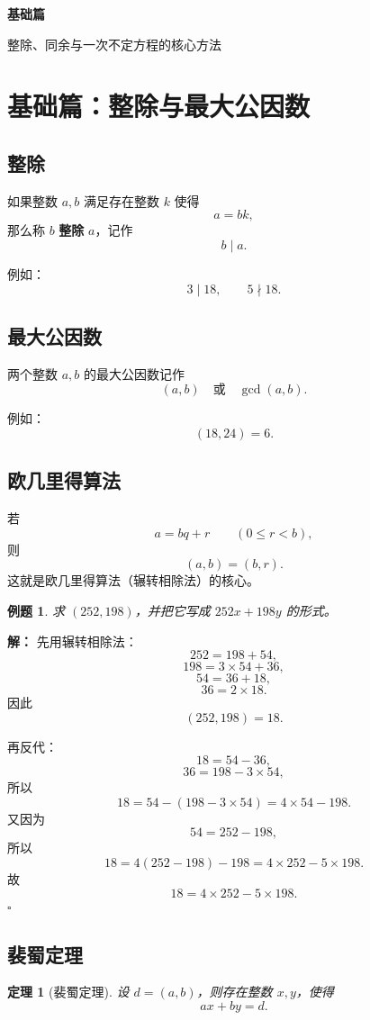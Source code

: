 \documentclass[11pt,a4paper,fontset=fandol]{ctexart}
\theoremstyle{formaltheorem}
\newtheorem{theorem}{定理}[section]
\theoremstyle{formalexample}
\newtheorem{example}{例题}[section]
\newenvironment{solution}{\par\noindent\textbf{解：}}{\hfill$\square$\par}
\newcommand{\partdivider}[2]{%
  \clearpage
  \thispagestyle{empty}
  \vspace*{\fill}
  \begin{center}
  \begin{tcolorbox}[
    enhanced,
    width=0.78\textwidth,
    colback=lightblue,
    colframe=mainblue,
    boxrule=0.9pt,
    arc=0mm,
    left=6mm,
    right=6mm,
    top=8mm,
    bottom=8mm
  ]
  \centering
  {\fontsize{24}{30}\selectfont\bfseries #1\par}
  \vspace{0.6cm}
  {\large #2\par}
  \end{tcolorbox}
  \end{center}
  \vspace*{\fill}
  \clearpage
}
\begin{document}
\partdivider{基础篇}{整除、同余与一次不定方程的核心方法}

\section{基础篇：整除与最大公因数}

\subsection{整除}

如果整数 $a,b$ 满足存在整数 $k$ 使得
\[
a=bk,
\]
那么称 $b$ \textbf{整除} $a$，记作
\[
b\mid a.
\]

例如：
\[
3\mid 18,\qquad 5\nmid 18.
\]

\subsection{最大公因数}

两个整数 $a,b$ 的最大公因数记作
\[
(a,b)\quad\text{或}\quad \gcd(a,b).
\]

例如：
\[
(18,24)=6.
\]

\subsection{欧几里得算法}

若
\[
a=bq+r\qquad (0\le r<b),
\]
则
\[
(a,b)=(b,r).
\]
这就是欧几里得算法（辗转相除法）的核心。

\begin{example}
求 $(252,198)$，并把它写成 $252x+198y$ 的形式。
\end{example}

\begin{solution}
先用辗转相除法：
\[
252=198+54,
\]
\[
198=3\times 54+36,
\]
\[
54=36+18,
\]
\[
36=2\times 18.
\]
因此
\[
(252,198)=18.
\]

再反代：
\[
18=54-36,
\]
\[
36=198-3\times 54,
\]
所以
\[
18=54-(198-3\times 54)=4\times 54-198.
\]
又因为
\[
54=252-198,
\]
所以
\[
18=4(252-198)-198=4\times 252-5\times 198.
\]
故
\[
\boxed{18=4\times 252-5\times 198}.
\]
\end{solution}

\subsection{裴蜀定理}

\begin{theorem}[裴蜀定理]
设 $d=(a,b)$，则存在整数 $x,y$，使得
\[
ax+by=d.
\]
\end{theorem}
\end{document}
